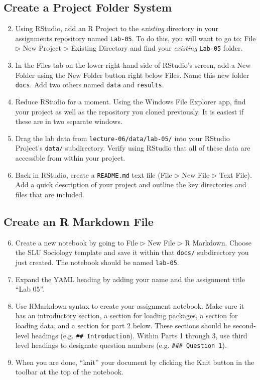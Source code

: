 \documentclass{tufte-handout}
\begin{document}
\subsection{Create a Project Folder System}
\begin{enumerate}[label=\alph*.]
\setcounter{enumi}{1}
\item Using RStudio, add an R Project to the \textit{existing} directory in your assignments repository named \texttt{Lab-05}. To do this, you will want to go to: \textsf{File $\triangleright$} {\color{red}\textsf{New Project}} \textsf{$\triangleright$ Existing Directory} and find your \textit{existing} \texttt{Lab-05} folder.
\item In the \textsf{Files} tab on the lower right-hand side of RStudio's screen, add a New Folder using the \textsf{New Folder} button right below \textsf{Files}. Name this new folder \texttt{docs}. Add two others named \texttt{data} and \texttt{results}.
\item Reduce RStudio for a moment. Using the Windows File Explorer app, find your project as well as the repository you cloned previously. It is easiest if these are in two separate windows.
\item Drag the lab data from \texttt{lecture-06/data/lab-05/} into your RStudio Project's \texttt{data/} subdirectory. Verify using RStudio that all of these data are accessible from within your project.
\item Back in RStudio, create a \texttt{README.md} text file (\textsf{File $\triangleright$} {\color{red}\textsf{New File}} \textsf{$\triangleright$ Text File}). Add a quick description of your project and outline the key directories and files that are included. 
\end{enumerate}

\vspace{3mm}
\subsection{Create an R Markdown File}
\begin{enumerate}[label=\alph*.]
\setcounter{enumi}{5}
\item Create a new notebook by going to \textsf{File $\triangleright$ New File $\triangleright$} {\color{red}\textsf{R Markdown}}. Choose the SLU Sociology template and save it within that \texttt{docs/} subdirectory you just created. The notebook should be named \texttt{lab-05}.
\item Expand the YAML heading by adding your name and the assignment title ``Lab 05''.
\item Use RMarkdown syntax to create your assignment notebook. Make sure it has an introductory section, a section for loading packages, a section for loading data, and a section for part 2 below. These sections should be second-level headings (e.g. \texttt{\#\# Introduction}). Within Parts 1 through 3, use third level headings to designate question numbers (e.g. \texttt{\#\#\# Question 1}).
\item When you are done, ``knit'' your document by clicking the \textsf{Knit} button in the toolbar at the top of the notebook.
\end{enumerate}
\end{document}
